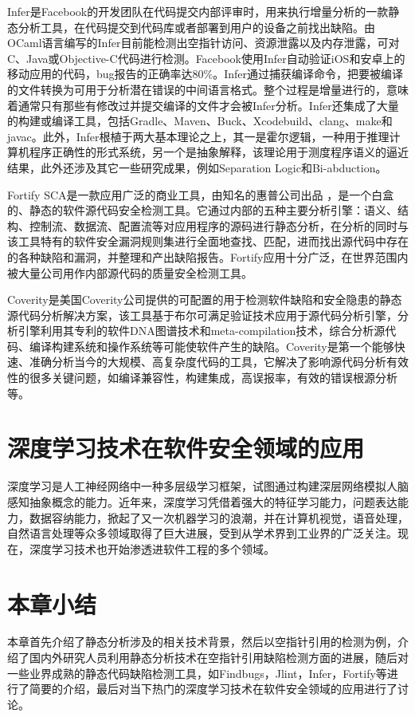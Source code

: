 Infer是Facebook的开发团队在代码提交内部评审时，用来执行增量分析的一款静态分析工具，在代码提交到代码库或者部署到用户的设备之前找出缺陷。由OCaml语言编写的Infer目前能检测出空指针访问、资源泄露以及内存泄露，可对C、Java或Objective-C代码进行检测。Facebook使用Infer自动验证iOS和安卓上的移动应用的代码，bug报告的正确率达80\%。Infer通过捕获编译命令，把要被编译的文件转换为可用于分析潜在错误的中间语言格式。整个过程是增量进行的，意味着通常只有那些有修改过并提交编译的文件才会被Infer分析。Infer还集成了大量的构建或编译工具，包括Gradle、Maven、Buck、Xcodebuild、clang、make和javac。此外，Infer根植于两大基本理论之上，其一是霍尔逻辑，一种用于推理计算机程序正确性的形式系统，另一个是抽象解释，该理论用于测度程序语义的逼近结果，此外还涉及其它一些研究成果，例如Separation Logic和Bi-abduction。

Fortify SCA是一款应用广泛的商业工具，由知名的惠普公司出品 ，是一个白盒的、静态的软件源代码安全检测工具。它通过内部的五种主要分析引擎：语义、结构、控制流、数据流、配置流等对应用程序的源码进行静态分析，在分析的同时与该工具特有的软件安全漏洞规则集进行全面地查找、匹配，进而找出源代码中存在的各种缺陷和漏洞，并整理和产出缺陷报告。Fortify应用十分广泛，在世界范围内被大量公司用作内部源代码的质量安全检测工具。

Coverity是美国Coverity公司提供的可配置的用于检测软件缺陷和安全隐患的静态源代码分析解决方案，该工具基于布尔可满足验证技术应用于源代码分析引擎，分析引擎利用其专利的软件DNA图谱技术和meta-compilation技术，综合分析源代码、编译构建系统和操作系统等可能使软件产生的缺陷。Coverity是第一个能够快速、准确分析当今的大规模、高复杂度代码的工具，它解决了影响源代码分析有效性的很多关键问题，如编译兼容性，构建集成，高误报率，有效的错误根源分析等。

\section{深度学习技术在软件安全领域的应用}
深度学习是人工神经网络中一种多层级学习框架，试图通过构建深层网络模拟人脑感知抽象概念的能力。近年来，深度学习凭借着强大的特征学习能力，问题表达能力，数据容纳能力，掀起了又一次机器学习的浪潮，并在计算机视觉，语音处理，自然语言处理等众多领域取得了巨大进展，受到从学术界到工业界的广泛关注。现在，深度学习技术也开始渗透进软件工程的多个领域。



\section{本章小结}
本章首先介绍了静态分析涉及的相关技术背景，然后以空指针引用的检测为例，介绍了国内外研究人员利用静态分析技术在空指针引用缺陷检测方面的进展，随后对一些业界成熟的静态代码缺陷检测工具，如Findbugs，Jlint，Infer，Fortify等进行了简要的介绍，最后对当下热门的深度学习技术在软件安全领域的应用进行了讨论。